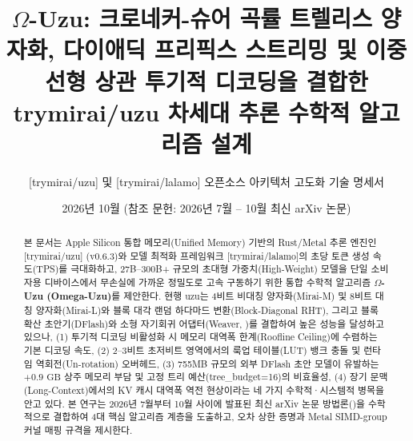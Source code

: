 \documentclass[10pt,a4paper]{article}
\title{\vspace{-12mm}\textbf{\color{primary}$\Omega$-Uzu: 크로네커-슈어 곡률 트렐리스 양자화, 다이애딕 프리픽스 스트리밍 및 이중선형 상관 투기적 디코딩을 결합한 \textsf{trymirai/uzu} 차세대 추론 수학적 알고리즘 설계}}
\author{[\textsf{trymirai/uzu}] 및 [\textsf{trymirai/lalamo}] 오픈소스 아키텍처 고도화 기술 명세서}
\date{2026년 10월 (참조 문헌: 2026년 7월 -- 10월 최신 arXiv 논문)}
\begin{document}
\maketitle
\vspace{-6mm}

\begin{abstract}
\noindent
본 문서는 Apple Silicon 통합 메모리(Unified Memory) 기반의 Rust/Metal 추론 엔진인 [\textsf{trymirai/uzu}] (v0.6.3)와 모델 최적화 프레임워크 [\textsf{trymirai/lalamo}]의 초당 토큰 생성 속도(TPS)를 극대화하고, 27B--300B+ 규모의 초대형 가중치(High-Weight) 모델을 단일 소비자용 디바이스에서 무손실에 가까운 정밀도로 고속 구동하기 위한 통합 수학적 알고리즘 \textbf{$\Omega$-Uzu (Omega-Uzu)}를 제안한다. 현행 \textsf{uzu}는 4비트 비대칭 양자화(\textsf{Mirai-M}) 및 8비트 대칭 양자화(\textsf{Mirai-L})와 블록 대각 랜덤 하다마드 변환(Block-Diagonal RHT), 그리고 블록 확산 초안기(\textsf{DFlash})와 소형 자기회귀 어댑터(\textsf{Weaver}, \cite{oda2026trees})를 결합하여 높은 성능을 달성하고 있으나, (1) 투기적 디코딩 비활성화 시 메모리 대역폭 한계(Roofline Ceiling)에 수렴하는 기본 디코딩 속도, (2) 2--3비트 초저비트 영역에서의 룩업 테이블(LUT) 뱅크 충돌 및 런타임 역회전(Un-rotation) 오버헤드, (3) 755MB 규모의 외부 \textsf{DFlash} 초안 모델이 유발하는 $+0.9\text{ GB}$ 상주 메모리 부담 및 고정 트리 예산(\textsf{tree\_budget=16})의 비효율성, (4) 장기 문맥(Long-Context)에서의 KV 캐시 대역폭 역전 현상이라는 네 가지 수학적·시스템적 병목을 안고 있다. 본 연구는 2026년 7월부터 10월 사이에 발표된 최신 arXiv 논문 방법론(\cite{oda2026trees,lee2026kronq,liu2026sparsespec,yun2026optr,laus2026aatc,lee2026schurquant,rusanovsky2026lilicorr,liu2026awsrc,specquant2026,ma2026gdntreescan,yoshida2026casa,panferov2026dq,singh2026kvwall,liu2026g2ptq,lee2026bytecross,wei2026stagq,ding2026curvetq,bhandari2026readkv})을 수학적으로 결합하여 4대 핵심 알고리즘 계층을 도출하고, 오차 상한 증명과 Metal SIMD-group 커널 매핑 규격을 제시한다.
\end{abstract}
\end{document}
